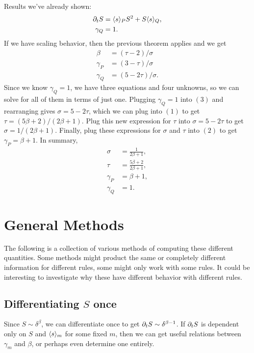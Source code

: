 \documentclass[twoside,10pt]{article}
\begin{document}
Results we've already shown:
\begin{align*}
	\partial_{t}{S} &= \langle s \rangle_{P} S^2 + S\langle s \rangle_{Q}, \\
	\gamma_{Q} &= 1.
\end{align*}
If we have scaling behavior, then the previous theorem applies and we get
\begin{align*}
	\beta &= (\tau-2)/\sigma \tag{1} \\
	\gamma_{P} &= (3-\tau)/\sigma \tag{2} \\
	\gamma_{Q} &= (5-2\tau)/\sigma. \tag{3}
\end{align*}
Since we know $\gamma_{Q}=1$, we have three equations and four unknowns, so we can solve for all of them in terms of just one. Plugging $\gamma_{Q}=1$ into $(3)$ and rearranging gives $\sigma=5-2\tau$, which we can plug into $(1)$ to get $\tau = (5\beta+2)/(2\beta+1)$. Plug this new expression for $\tau$ into $\sigma=5-2\tau$ to get $\sigma = 1/(2\beta+1)$. Finally, plug these expressions for $\sigma$ and $\tau$ into $(2)$ to get $\gamma_{P} = \beta+1$. In summary,
\begin{align*}
	\sigma &= \frac{1}{2\beta+1} , \\
	\tau &= \frac{5\beta+2}{2\beta+1} , \\
	\gamma_{P} &= \beta+1, \\
	\gamma_{Q} &= 1.
\end{align*}


\section{General Methods}

The following is a collection of various methods of computing these different quantities. Some methods might product the same or completely different information for different rules, some might only work with some rules. It could be interesting to investigate why these have different behavior with different rules.


\subsection{Differentiating \texorpdfstring{$S$}{S} once}

Since $S \sim \delta^{\beta}$, we can differentiate once to get $\partial_{t}{S} \sim \delta^{\beta-1}$. If $\partial_{t}{S} $ is dependent only on $S$ and $\langle s \rangle_{m}$ for some fixed $m$, then we can get useful relations between $\gamma_{m}$ and $\beta$, or perhaps even determine one entirely.
\end{document}
